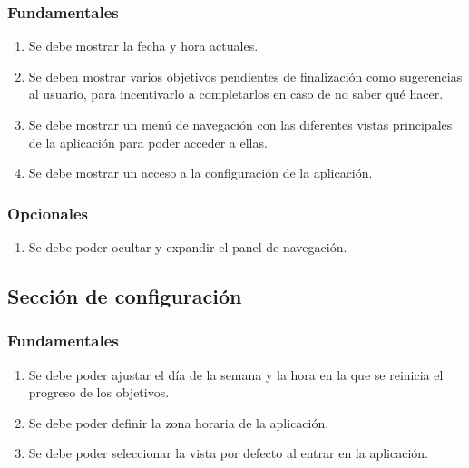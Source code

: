 \documentclass[10pt, a4paper]{aqademic}
\begin{document}
\subsubsection*{Fundamentales}

\begin{enumerate}[resume]
	\item Se debe mostrar la fecha y hora actuales.
	
	\item Se deben mostrar varios objetivos pendientes de finalización como sugerencias al usuario, para incentivarlo a completarlos en caso de no saber qué hacer.
	
	\item Se debe mostrar un menú de navegación con las diferentes vistas principales de la aplicación para poder acceder a ellas.
	
	\item Se debe mostrar un acceso a la configuración de la aplicación.
\end{enumerate}

\subsubsection*{Opcionales}

\begin{enumerate}[resume]
	\item Se debe poder ocultar y expandir el panel de navegación.
\end{enumerate}


\subsection*{Sección de configuración}

\subsubsection*{Fundamentales}

\begin{enumerate}[resume]
	\item Se debe poder ajustar el día de la semana y la hora en la que se reinicia el progreso de los objetivos.
	
	\item Se debe poder definir la zona horaria de la aplicación.
	
	\item Se debe poder seleccionar la vista por defecto al entrar en la aplicación.
\end{enumerate}
\end{document}
